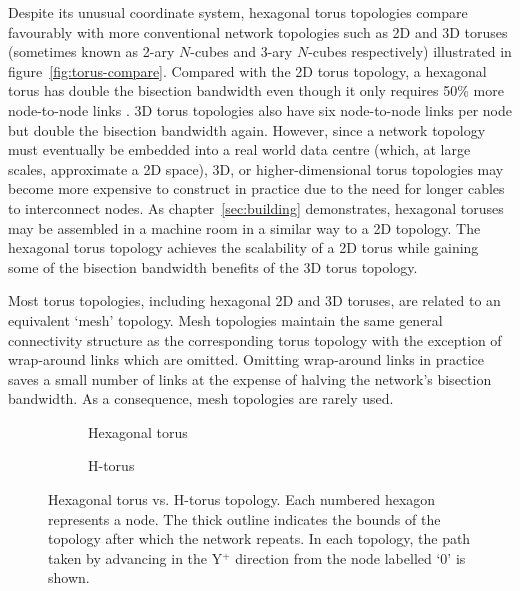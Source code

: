 		Despite its unusual coordinate system, hexagonal torus topologies compare
		favourably with more conventional network topologies such as 2D and 3D
		toruses (sometimes known as 2-ary $N$-cubes and 3-ary $N$-cubes
		respectively) \cite{dally04} illustrated in figure~\ref{fig:torus-compare}.
		Compared with the 2D torus topology, a hexagonal torus has double the
		bisection bandwidth even though it only requires 50\% more node-to-node
		links \cite{navaridas09}. 3D torus topologies also have six node-to-node
		links per node but double the bisection bandwidth again. However, since a
		network topology must eventually be embedded into a real world data centre
		(which, at large scales, approximate a 2D space), 3D, or higher-dimensional
		torus topologies may become more expensive to construct in practice due to
		the need for longer cables to interconnect nodes. As
		chapter~\ref{sec:building} demonstrates, hexagonal toruses may be assembled
		in a machine room in a similar way to a 2D topology. The hexagonal torus
		topology achieves the scalability of a 2D torus while gaining some of the
		bisection bandwidth benefits of the 3D torus topology.
		
		Most torus topologies, including hexagonal 2D and 3D toruses, are related
		to an equivalent `mesh' topology. Mesh topologies maintain the same general
		connectivity structure as the corresponding torus topology with the
		exception of wrap-around links which are omitted. Omitting wrap-around
		links in practice saves a small number of links at the expense of halving
		the network's bisection bandwidth. As a consequence, mesh topologies are
		rarely used.
		
		\begin{figure}
			\center
			\begin{subfigure}[b]{0.45\linewidth}
				\center
				\caption{Hexagonal torus}
				\label{fig:topo-compare-hexagonal-torus}
			\end{subfigure}
			\begin{subfigure}[b]{0.45\linewidth}
				\center
				\caption{H-torus}
				\label{fig:topo-compare-h-torus}
			\end{subfigure}
			
			\caption{Hexagonal torus vs. H-torus topology. Each numbered hexagon
			represents a node. The thick outline indicates the bounds of the
			topology after which the network repeats. In each topology, the path
			taken by advancing in the Y$^+$ direction from the node labelled `0' is
			shown.}
			\label{fig:topo-compare}
		\end{figure}
		
